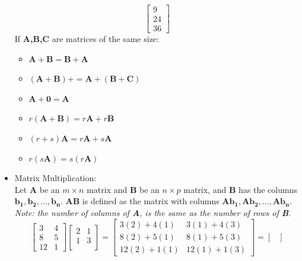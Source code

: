 \documentclass[nobib]{tufte-handout}
\begin{document}
\begin{itemize}
\begin{equation*}
\begin{bmatrix}
                  9  \\
                  24 \\
                  36
              \end{bmatrix}
          \end{equation*}
          If \textbf{A,B,C} are matrices of the same size:\
          \begin{itemize}
              \item $\mathbf{A+B=B+A}$
              \item $\mathbf{(A+B)+=A+(B+C)}$
              \item $\mathbf{A+0=A}$
              \item $r\mathbf{(A+B)=}r\mathbf{A}+r\mathbf{B}$
              \item $(r+s)\mathbf{A=}r\mathbf{A}+s\mathbf{A}$
              \item $r(s\mathbf{A}) = s(r\mathbf{A})$
          \end{itemize}
    \item Matrix Multiplication:\\ Let \textbf{A} be an $m\times n$ matrix and \textbf{B}
          be an $n\times p$ matrix, and \textbf{B} has the columns
          $\mathbf{b_1,b_2,\ldots,b_n}$. \textbf{AB} is defined as the matrix with
          columns $\mathbf{Ab_1,Ab_2,\ldots,Ab_n}$.\\ \textit{Note: the number of columns
              of \textbf{A}, is the same as the number of rows of \textbf{B}}.
          \begin{equation*}
              \begin{bmatrix}
                  3  & 4 \\
                  8  & 5 \\
                  12 & 1
              \end{bmatrix}
              \begin{bmatrix}
                  2 & 1 \\
                  1 & 3 \\
              \end{bmatrix}
              =
              \begin{bmatrix}
                  3(2)+4(1)  & 3(1)+4(3)  \\
                  8(2)+5(1)  & 8(1)+5(3)  \\
                  12(2)+1(1) & 12(1)+1(3)
              \end{bmatrix} =
              \begin{bmatrix}

\end{bmatrix}
\end{equation*}
\end{itemize}
\end{document}
